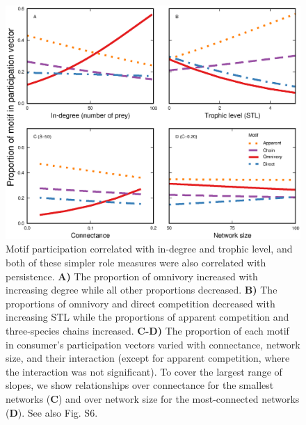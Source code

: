 \documentclass[12pt]{article}
\begin{document}
\begin{spacing}{2.0}
    \begin{figure}[hb!]
        \centering
        \includegraphics[width=\textwidth]{figures/roles_vs_TL.eps}
        \caption{Motif participation correlated with in-degree and trophic level, and both of these simpler role measures were also correlated with persistence. \textbf{A)} The proportion of omnivory increased with increasing degree while all other proportions decreased. \textbf{B)} The proportions of omnivory and direct competition decreased with increasing STL while the proportions of apparent competition and three-species chains increased. \textbf{C-D)} The proportion of each motif in consumer's participation vectors varied with connectance, network size, and their interaction (except for apparent competition, where the interaction was not significant). To cover the largest range of slopes, we show relationships over connectance for the smallest networks (\textbf{C}) and over network size for the most-connected networks (\textbf{D}). See also Fig. S6.}
        \label{fig:motifs_vs_TL_and_deg}
    \end{figure}        

\end{spacing}
\end{document}
